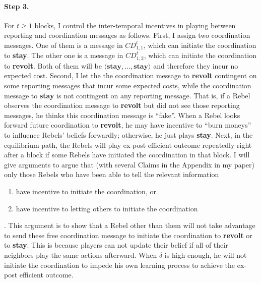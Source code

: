 \documentclass[12pt,letter]{article}
\theoremstyle{definition}
\theoremstyle{remark}
\theoremstyle{claim}
\begin{document}
\paragraph{Step 3.} For $t\geq 1$ blocks, I control the inter-temporal incentives in playing between reporting and coordination messages as follows. First, I assign two coordination messages. One of them is a message in $CD^t_{1,1}$, which can initiate the coordination to \textbf{stay}. The other one is a message in $ CD^t_{1,2} $, which can initiate the coordination to \textbf{revolt}. Both of them will be $\langle \textbf{stay},...,\textbf{stay} \rangle$ and therefore they incur no expected cost. Second, I let the the coordination message to \textbf{revolt} contingent on some reporting messages that incur some expected costs, while the coordination message to \textbf{stay} is not contingent on any reporting message. That is, if a Rebel observes the coordination message to \textbf{revolt} but did not see those reporting messages, he thinks this coordination message is ``fake''. When a Rebel looks forward future coordination to \textbf{revolt}, he may have incentive to ``burn moneys'' to influence Rebels' beliefs forwardly; otherwise, he just plays \textbf{stay}. Next, in the equilibrium path, the Rebels will play ex-post efficient outcome repeatedly right after a block if some Rebels have initiated the coordination in that block. I will give arguments to argue that (with {several Claims in the Appendix} in my paper) only those Rebels who have been able to tell the relevant information 
\begin{enumerate}
\item have incentive to initiate the coordination, or
\item have incentive to letting others to initiate the coordination
\end{enumerate}
. This argument is to show that a Rebel other than them will not take advantage to send these free coordination message to initiate the coordination to \textbf{revolt} or to \textbf{stay}. This is because players can not update their belief if all of their neighbors play the same actions afterward. When $\delta$ is high enough, he will not initiate the coordination to impede his own learning process to achieve the ex-post efficient outcome.
\end{document}
